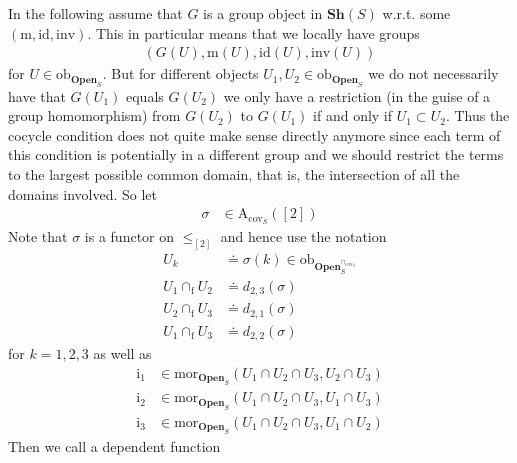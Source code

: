 \begin{exa}
\label{exa:gs3}
In the following assume that $G$ is a group object in $\mathbf{Sh}(S)$ w.r.t. some $(\mathrm{m},\mathrm{id},\mathrm{inv})$. This in particular means that we locally have groups
\begin{align*}
  \left(
    G(U),
    \mathrm{m}(U),
    \mathrm{id}(U),
    \mathrm{inv}(U)
  \right)
\end{align*}
for $U \in \mathrm{ob}_{\mathbf{Open}_{S}}$. But for different objects $U_{1},U_{2} \in \mathrm{ob}_{\mathbf{Open}_{S}}$ we do not necessarily have that $G(U_{1})$ equals $G(U_{2})$ we only have a restriction (in the guise of a group homomorphism) from $G(U_{2})$ to $G(U_{1})$ if and only if $U_{1} \subset U_{2}$. Thus the cocycle condition does not quite make sense directly anymore since each term of this condition is potentially in a different group and we should restrict the terms to the largest possible common domain, that is, the intersection of all the domains involved. So let
\begin{align*}
  \sigma
  &\in
  \mathrm{A}_{\mathrm{cov}_{S}}([2])
\end{align*}
Note that $\sigma$ is a functor on $\pmb{\leq}_{[2]}$ and hence use the notation
\begin{align*}
  U_{k}
  &\doteq
  \sigma(k)
  \in
  \mathrm{ob}_{\mathbf{Open}_{S}^{\cap_{\mathrm{cov}_{S}}}}
  \\
  U_{1}
  \cap_{\textrm{f}}
  U_{2}
  &\doteq
  d_{2,3}(\sigma)
  \\
  U_{2}
  \cap_{\textrm{f}}
  U_{3}
  &\doteq
  d_{2,1}(\sigma)
  \\
  U_{1}
  \cap_{\textrm{f}}
  U_{3}
  &\doteq
  d_{2,2}(\sigma)
\end{align*}
for $k = 1,2,3$ as well as
\begin{align*}
  \mathrm{i}_{1}
  &\in
  \mathrm{mor}_{\mathbf{Open}_{S}}
  \left(
    U_{1}
    \cap
    U_{2}
    \cap
    U_{3},
    U_{2}
    \cap
    U_{3}
  \right)
  \\
  \mathrm{i}_{2}
  &\in
  \mathrm{mor}_{\mathbf{Open}_{S}}
  \left(
    U_{1}
    \cap
    U_{2}
    \cap
    U_{3},
    U_{1}
    \cap
    U_{3}
  \right)
  \\
  \mathrm{i}_{3}
  &\in
  \mathrm{mor}_{\mathbf{Open}_{S}}
  \left(
    U_{1}
    \cap
    U_{2}
    \cap
    U_{3},
    U_{1}
    \cap
    U_{2}
  \right)
\end{align*}
Then we call a dependent function
\begin{align*}

\end{align*}
\end{exa}
